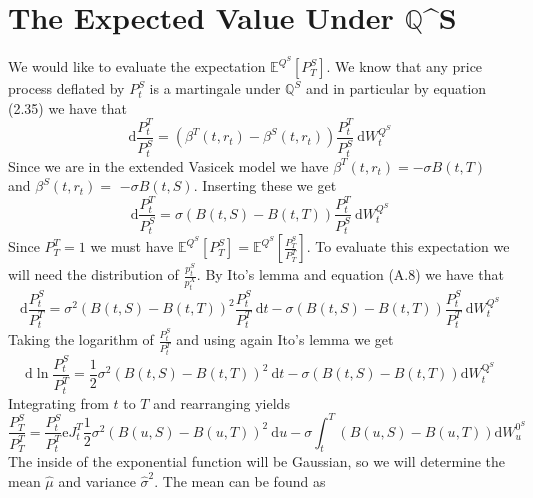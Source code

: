 \documentclass[12pt,twoside]{reedthesis}
\begin{document}
\hypertarget{the-expected-value-under-mathbbqs}{%
\section{\texorpdfstring{The Expected Value Under \(\mathbb{Q}\)\^{}S}{The Expected Value Under \textbackslash mathbb\{Q\}\^{}S}}\label{the-expected-value-under-mathbbqs}}

We would like to evaluate the expectation \(\mathbb{E}^{Q^{S}}\left[P_{T}^{S}\right]\). We know that any price process deflated by \(P_{t}^{S}\) is a martingale under \(\mathbb{Q}^{S}\) and in particular by equation (2.35) we have that
\[
\mathrm{d} \frac{P_{t}^{T}}{P_{t}^{S}}=\left(\beta^{T}\left(t, r_{t}\right)-\beta^{S}\left(t, r_{t}\right)\right) \frac{P_{t}^{T}}{P_{t}^{S}} \mathrm{~d} W_{t}^{Q^{S}}
\]
Since we are in the extended Vasicek model we have \(\beta^{T}\left(t, r_{t}\right)=-\sigma B(t, T)\) and \(\beta^{S}\left(t, r_{t}\right)=\) \(-\sigma B(t, S)\). Inserting these we get
\[
\mathrm{d} \frac{P_{t}^{T}}{P_{t}^{S}}=\sigma(B(t, S)-B(t, T)) \frac{P_{t}^{T}}{P_{t}^{S}} \mathrm{~d} W_{t}^{Q^{S}}
\]
Since \(P_{T}^{T}=1\) we must have \(\mathbb{E}^{Q^{S}}\left[P_{T}^{S}\right]=\mathbb{E}^{Q^{S}}\left[\frac{P_{T}^{S}}{P_{T}^{T}}\right]\). To evaluate this expectation we will need the distribution of \(\frac{p_{t}^{S}}{p_{t}^{X}}\). By Ito's lemma and equation (A.8) we have that
\[
\mathrm{d} \frac{P_{t}^{S}}{P_{t}^{T}}=\sigma^{2}(B(t, S)-B(t, T))^{2} \frac{P_{t}^{S}}{P_{t}^{T}} \mathrm{~d} t-\sigma(B(t, S)-B(t, T)) \frac{P_{t}^{S}}{P_{t}^{T}} \mathrm{~d} W_{t}^{Q^{S}}
\]
Taking the logarithm of \(\frac{P_{t}^{S}}{P_{t}^{T}}\) and using again Ito's lemma we get
\[
\mathrm{d} \ln \frac{P_{t}^{S}}{P_{t}^{T}}=\frac{1}{2} \sigma^{2}(B(t, S)-B(t, T))^{2} \mathrm{~d} t-\sigma(B(t, S)-B(t, T)) \mathrm{d} W_{t}^{\mathrm{Q}^{S}}
\]
Integrating from \(t\) to \(T\) and rearranging yields
\[
\frac{P_{T}^{S}}{P_{T}^{T}}=\frac{P_{t}^{S}}{P_{t}^{T}} \mathrm{e} J_{t}^{T} \frac{1}{2} \sigma^{2}(B(u, S)-B(u, T))^{2} \mathrm{~d} u-\sigma \int_{t}^{T}(B(u, S)-B(u, T)) \mathrm{d} W_{u}^{0^{S}}
\]
The inside of the exponential function will be Gaussian, so we will determine the mean \(\hat{\mu}\) and variance \(\hat{\sigma}^{2}\). The mean can be found as
\end{document}
